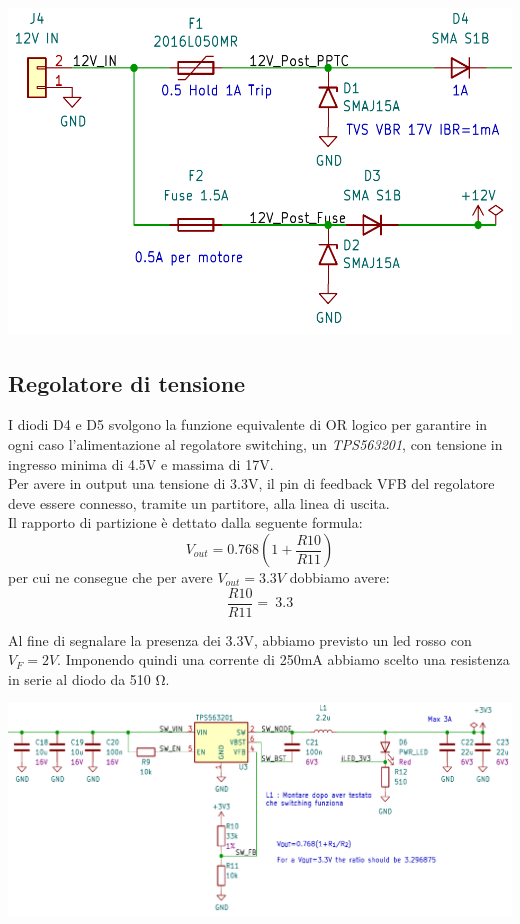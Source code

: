 \begin{center}
\includegraphics[scale=0.5]{figures/image105.png}
\captionsetup{type=figure}
\end{center}

\hypertarget{regolatore-di-tensione}{%
\subsection{\texorpdfstring{Regolatore di tensione}{Regolatore di tensione}}\label{regolatore-di-tensione}}

I diodi D4 e D5 svolgono la funzione equivalente di OR logico per garantire in ogni caso l’alimentazione al regolatore switching,
un \emph{TPS563201}, con tensione in ingresso minima di 4.5V e massima di 17V.\\
Per avere in output una tensione di 3.3V, il pin di feedback VFB del regolatore deve essere connesso, tramite un partitore, alla linea di uscita.\\
Il rapporto di partizione è dettato dalla seguente formula:\\
\[V_{out} = 0.768(1 + \frac{R10}{R11})\]
per cui ne consegue che per avere $V_{out}=3.3V$ dobbiamo avere:\\
\[\frac{R10}{R11} = \ 3.3\]

Al fine di segnalare la presenza dei 3.3V, abbiamo previsto un led rosso con $V_F=2V$.
Imponendo quindi una corrente di 250mA abbiamo scelto una resistenza in serie al diodo da 510 Ω.

\begin{center}
\includegraphics[scale=0.3]{figures/image103.png}
\captionsetup{type=figure}
\end{center}
      
